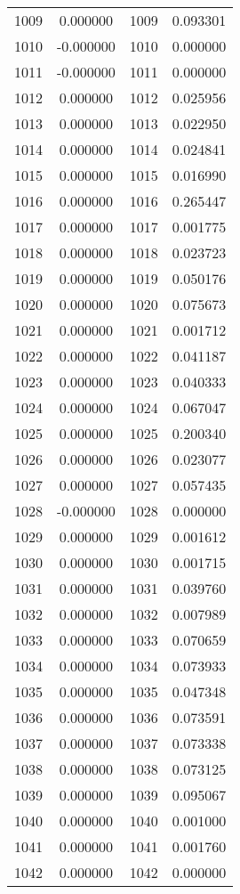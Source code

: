 \documentclass[12pt]{article}
\begin{document}
\begin{longtable}{@{}cccc@{}}
1009 & 0.000000 & 1009 & 0.093301 \\
1010 & -0.000000 & 1010 & 0.000000 \\
1011 & -0.000000 & 1011 & 0.000000 \\
1012 & 0.000000 & 1012 & 0.025956 \\
1013 & 0.000000 & 1013 & 0.022950 \\
1014 & 0.000000 & 1014 & 0.024841 \\
1015 & 0.000000 & 1015 & 0.016990 \\
1016 & 0.000000 & 1016 & 0.265447 \\
1017 & 0.000000 & 1017 & 0.001775 \\
1018 & 0.000000 & 1018 & 0.023723 \\
1019 & 0.000000 & 1019 & 0.050176 \\
1020 & 0.000000 & 1020 & 0.075673 \\
1021 & 0.000000 & 1021 & 0.001712 \\
1022 & 0.000000 & 1022 & 0.041187 \\
1023 & 0.000000 & 1023 & 0.040333 \\
1024 & 0.000000 & 1024 & 0.067047 \\
1025 & 0.000000 & 1025 & 0.200340 \\
1026 & 0.000000 & 1026 & 0.023077 \\
1027 & 0.000000 & 1027 & 0.057435 \\
1028 & -0.000000 & 1028 & 0.000000 \\
1029 & 0.000000 & 1029 & 0.001612 \\
1030 & 0.000000 & 1030 & 0.001715 \\
1031 & 0.000000 & 1031 & 0.039760 \\
1032 & 0.000000 & 1032 & 0.007989 \\
1033 & 0.000000 & 1033 & 0.070659 \\
1034 & 0.000000 & 1034 & 0.073933 \\
1035 & 0.000000 & 1035 & 0.047348 \\
1036 & 0.000000 & 1036 & 0.073591 \\
1037 & 0.000000 & 1037 & 0.073338 \\
1038 & 0.000000 & 1038 & 0.073125 \\
1039 & 0.000000 & 1039 & 0.095067 \\
1040 & 0.000000 & 1040 & 0.001000 \\
1041 & 0.000000 & 1041 & 0.001760 \\
1042 & 0.000000 & 1042 & 0.000000 \\

\end{longtable}
\end{document}
